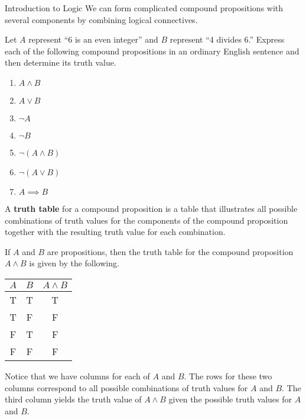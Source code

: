 \begin{section}{Introduction to Logic}
We can form complicated compound propositions with several components by combining logical connectives.


\begin{problem}\label{prob:translations}
Let $A$ represent ``6 is an even integer'' and $B$ represent ``4 divides 6.''  Express each of the following compound propositions in an ordinary English sentence and then determine its truth value.
\begin{enumerate}[label=\textrm{(\alph*)}]
  \item $A \wedge B$
  \item $A \vee B$
  \item $\neg A$
  \item $\neg B$
  \item $\neg (A \wedge B)$
  \item $\neg (A \vee B)$
  \item $A \implies B$
\end{enumerate}
\end{problem}

\begin{definition}
A \textbf{truth table} for a compound proposition is a table that illustrates all possible combinations of truth values for the components of the compound proposition together with the resulting truth value for each combination. 
\end{definition}

\begin{example}
If $A$ and $B$ are propositions, then the truth table for the compound proposition $A\wedge B$ is given by the following.
\begin{center}
\begin{tabular}{@{}ccc@{}}
\toprule
$A$  &  $B$ & $A \wedge B$  \\
\midrule
T & T & T  \\ 
T & F & F  \\ 
F & T & F  \\ 
F & F & F  \\
\bottomrule
\end{tabular}
\end{center}
Notice that we have columns for each of $A$ and $B$.  The rows for these two columns correspond to all possible combinations of truth values for $A$ and $B$.  The third column yields the truth value of $A\wedge B$ given the possible truth values for $A$ and $B$.
\end{example}


\end{section}
